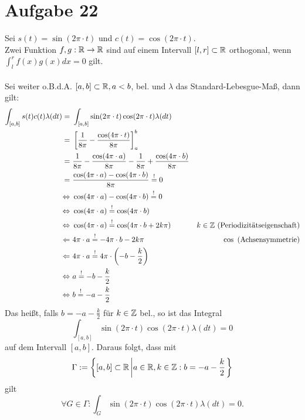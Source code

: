 

	\section*{Aufgabe 22}
		Sei $s(t) = \sin(2\pi\cdot t)$ und $c(t) = \cos(2\pi\cdot t)$.\\
		Zwei Funktion $f,g:{\mathbb R}\to{\mathbb R}$ sind auf einem Intervall $[l,r]\subset{\mathbb R}$ orthogonal, wenn $\int_l^rf(x)g(x)dx = 0$ gilt.\\
		\\
		Sei weiter o.B.d.A. $[a,b]\subset {\mathbb R}, a < b$, bel. und $\lambda$ das Standard-Lebesgue-Maß, dann gilt:
		\begin{align*}
			\int_{[a,b]} s(t)c(t)\lambda(dt) =\ & \int_{[a,b]}\sin(2\pi\cdot t)\cos(2\pi\cdot t)\lambda(dt)\\
			=\ & \left[\frac{1}{8\pi}-\frac{\cos(4\pi\cdot t)}{8\pi}\right]_a^b\\
			=\ & \frac{1}{8\pi}-\frac{\cos(4\pi\cdot a)}{8\pi}-\frac{1}{8\pi}+\frac{\cos(4\pi\cdot b)}{8\pi}\\
			=\ & \frac{\cos(4\pi\cdot a) - \cos(4\pi\cdot b)}{8\pi}\overset{!}{=} 0\\
			\Leftrightarrow\ & \cos(4\pi\cdot a) - \cos(4\pi\cdot b) \overset{!}{=} 0\\
			\Leftrightarrow\ & \cos(4\pi\cdot a) \overset{!}{=} \cos(4\pi\cdot b)\\
			\Leftrightarrow\ & \cos(4\pi\cdot a) \overset{!}{=} \cos(4\pi\cdot b + 2k\pi)	& k\in\Z\text{ (Periodizitätseigenschaft)}\\
			\Leftarrow\	& 4\pi \cdot a \overset{!}{=} -4\pi\cdot b - 2k\pi& \cos \text{ (Achsensymmetrie)}\\
			\Leftarrow\	& 4\pi \cdot a \overset{!}{=} 4\pi\cdot \left(-b  -\frac{k}{2}\right)\\
			\Leftrightarrow\ & a \overset{!}{=} -b  -\frac{k}{2}\\
			\Leftrightarrow\ & b \overset{!}{=} -a  -\frac{k}{2}
		\end{align*}
		Das heißt, falls $b = -a  -\frac{k}{2}$ für $k\in{\mathbb Z}$ bel., so ist das Integral
		$$\int_{[a,b]}\sin(2\pi\cdot t)\cos(2\pi\cdot t) \lambda(dt) = 0$$
		auf dem Intervall $[a,b]$.
		Daraus folgt, dass mit
		$$\Gamma := \left\lbrace [a,b]\subset {\mathbb R} \left| a\in{\mathbb R}, k\in{\mathbb Z}: b = -a  -\frac{k}{2} \right.\right\rbrace$$
		gilt 
		$$\forall G\in \Gamma:\int_G\sin(2\pi\cdot t)\cos(2\pi\cdot t) \lambda(dt) = 0.$$
